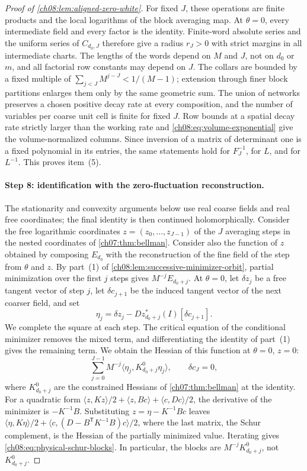 \begin{proof}[Proof of \cref{ch08:lem:aligned-zero-white}]
For fixed $J$, these operations are finite products and the local logarithms of the block averaging map. At $\theta=0$, every intermediate field and every factor is the identity. Finite-word absolute series and the uniform series of $C_{d_0,J}$ therefore give a radius $r_J>0$ with strict margins in all intermediate charts. The lengths of the words depend on $M$ and $J$, not on $d_0$ or $m$, and all factorial row constants may depend on $J$. The collars are bounded by a fixed multiple of $\sum_{j<J}M^{j-J}<1/(M-1)$; extension through finer block partitions enlarges them only by the same geometric sum. The union of networks preserves a chosen positive decay rate at every composition, and the number of variables per coarse unit cell is finite for fixed $J$. Row bounds at a spatial decay rate strictly larger than the working rate and \eqref{ch08:eq:volume-exponential} give the volume-normalized columns. Since inversion of a matrix of determinant one is a fixed polynomial in its entries, the same statements hold for $F_J^{-1}$, for $L$, and for $L^{-1}$. This proves item~(5).

\paragraph{Step 8: identification with the zero-fluctuation reconstruction.}
The stationarity and convexity arguments below use real coarse fields and real free coordinates; the final identity is then continued holomorphically. Consider the free logarithmic coordinates $z=(z_0,\dots,z_{J-1})$ of the $J$ averaging steps in the nested coordinates of \cref{ch07:thm:bellman}. Consider also the function of $z$ obtained by composing $E_{d_0}$ with the reconstruction of the fine field of the step from $\theta$ and $z$. By part~(1) of \cref{ch08:lem:successive-minimizer-orbit}, partial minimization over the first $j$ steps gives $M^{-j}E_{d_0+j}$. At $\theta=0$, let $\delta z_j$ be a free tangent vector of step $j$, let $\delta c_{j+1}$ be the induced tangent vector of the next coarser field, and set
\[
 \eta_j=\delta z_j-Dz_{d_0+j}^*(I)[\delta c_{j+1}].
\]
We complete the square at each step. The critical equation of the conditional minimizer removes the mixed term, and differentiating the identity of part~(1) gives the remaining term. We obtain the Hessian of this function at $\theta=0$, $z=0$:
\begin{equation}\label{ch08:eq:physical-schur-blocks}
 \sum_{j=0}^{J-1}M^{-j}
           \langle\eta_j,K_{d_0+j}^{0}\eta_j\rangle,
 \qquad \delta c_J=0,
\end{equation}
where $K^0_{d_0+j}$ are the constrained Hessians of \cref{ch07:thm:bellman} at the identity. For a quadratic form $\langle z,Kz\rangle/2+\langle z,Bc\rangle+\langle c,Dc\rangle/2$, the derivative of the minimizer is $-K^{-1}B$. Substituting $z=\eta-K^{-1}Bc$ leaves $\langle\eta,K\eta\rangle/2+\langle c,(D-B^{\mathsf T}K^{-1}B)c\rangle/2$, where the last matrix, the Schur complement, is the Hessian of the partially minimized value. Iterating gives \eqref{ch08:eq:physical-schur-blocks}. In particular, the blocks are $M^{-j}K_{d_0+j}^{0}$, not $K_{d_0+j}^{0}$.


\end{proof}
